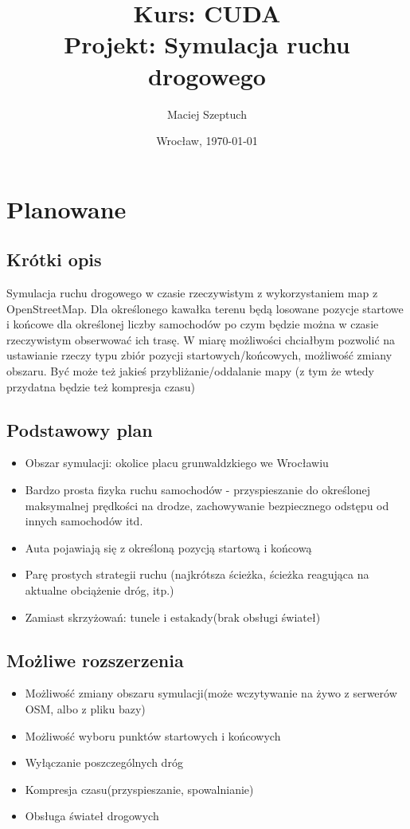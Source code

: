 \documentclass[12pt,leqno]{article}
\title{\LARGE \textbf{{Kurs: CUDA}}\\
      {\Large Projekt: Symulacja ruchu drogowego}\\
}
\author{Maciej Szeptuch}
\date{Wrocław, \today}
\begin{document}
\thispagestyle{empty}
\maketitle

\section{Planowane}
\subsection{Krótki opis}
Symulacja ruchu drogowego w czasie rzeczywistym z wykorzystaniem map
z OpenStreetMap. Dla określonego kawałka terenu będą losowane pozycje
startowe i końcowe dla określonej liczby samochodów po czym będzie można
w czasie rzeczywistym obserwować ich trasę. W miarę możliwości chciałbym
pozwolić na ustawianie rzeczy typu zbiór pozycji startowych/końcowych,
możliwość zmiany obszaru. Być może też jakieś przybliżanie/oddalanie mapy
(z tym że wtedy przydatna będzie też kompresja czasu)

\subsection{Podstawowy plan}
\begin{itemize}
    \item Obszar symulacji: okolice placu grunwaldzkiego we Wrocławiu
    \item Bardzo prosta fizyka ruchu samochodów - przyspieszanie do określonej
        maksymalnej prędkości na drodze, zachowywanie bezpiecznego odstępu od
        innych samochodów itd.
    \item Auta pojawiają się z określoną pozycją startową i końcową
    \item Parę prostych strategii ruchu (najkrótsza ścieżka, ścieżka
        reagująca na aktualne obciążenie dróg, itp.)

    \item Zamiast skrzyżowań: tunele i estakady(brak obsługi świateł)
\end{itemize}

\subsection{Możliwe rozszerzenia}
\begin{itemize}
    \item Możliwość zmiany obszaru symulacji(może wczytywanie na żywo
        z serwerów OSM, albo z pliku bazy)

    \item Możliwość wyboru punktów startowych i końcowych
    \item Wyłączanie poszczególnych dróg
    \item Kompresja czasu(przyspieszanie, spowalnianie)
    \item Obsługa świateł drogowych
\end{itemize}
\end{document}
